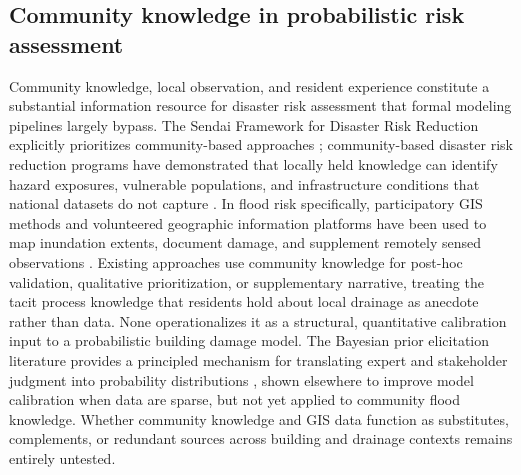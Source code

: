 \documentclass[11pt]{article}
\begin{document}
\subsection{Community knowledge in probabilistic risk assessment}
Community knowledge, local observation, and resident experience constitute a
substantial information resource for disaster risk assessment that formal modeling
pipelines largely bypass.
The Sendai Framework for Disaster Risk Reduction explicitly prioritizes
community-based approaches \cite{undrr2015sendai}; community-based disaster risk reduction programs have
demonstrated that locally held knowledge can identify hazard exposures, vulnerable
populations, and infrastructure conditions that national datasets do not capture
\cite{twigg2015disaster}.
In flood risk specifically, participatory GIS methods and volunteered geographic
information platforms have been used to map inundation extents, document damage,
and supplement remotely sensed observations \cite{goodchild2007citizens,assumpcao2018citizen}.
Existing approaches use community knowledge for post-hoc validation, qualitative
prioritization, or supplementary narrative, treating the tacit process knowledge
that residents hold about local drainage as anecdote rather than data. None
operationalizes it as a structural, quantitative calibration input to a
probabilistic building damage model.
The Bayesian prior elicitation literature provides a principled mechanism for
translating expert and stakeholder judgment into probability distributions
\cite{ohagan2006uncertain,garthwaite2005statistical}, shown elsewhere to improve
model calibration when data are sparse, but not yet applied to community flood
knowledge.
Whether community knowledge and GIS data function as substitutes, complements, or
redundant sources across building and drainage contexts remains entirely untested.
\end{document}
